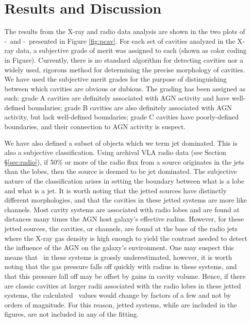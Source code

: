 \documentclass{emulateapj}
\begin{document}
\section{Results and Discussion}
\label{sec:r&d}

The results from the X-ray and radio data analysis are shown in the
two plots of \pcav-\phigh\ and \pcav-\plow\ presented in Figure
\ref{fig:pcav}. For each set of cavities analyzed in the X-ray data, a
subjective grade of merit was assigned to each (shown as color coding
in Figure). Currently, there is no standard algorithm for detecting
cavities nor a widely used, rigorous method for determining the
precise morphology of cavities. We have used the subjective merit
grades for the purpose of distinguishing between which cavities are
obvious or dubious. The grading has been assigned as such: grade A
cavities are definitely associated with AGN activity and have
well-defined boundaries; grade B cavities are also definitely
associated with AGN activity, but lack well-defined boundaries; grade
C cavities have poorly-defined boundaries, and their connection to AGN
activity is suspect.

We have also defined a subset of objects which we term jet
dominated. This is also a subjective classification. Using archival
VLA radio data (see Section \S\ref{sec:radio}), if 50\% or more of the
radio flux from a source originates in the jets than the lobes, then
the source is deemed to be jet dominated. The subjective nature of the
classification arises in setting the boundary between what is a lobe
and what is a jet. It is worth noting that the jetted sources have
distinctly different morphologies, and that the cavities in these
jetted systems are more like channels. Most cavity systems are
associated with radio lobes and are found at distances many times the
AGN host galaxy's effective radius. However, for these jetted sources,
the cavities, or channels, are found at the base of the radio jets
where the X-ray gas density is high enough to yield the contrast
needed to detect the influence of the AGN on the galaxy's
environment. One may suspect this means that \pcav\ in these systems
is grossly underestimated, however, it is worth noting that the gas
pressure falls off quickly with radius in these systems, and that this
pressure fall off may be offset by gains in cavity volume. Hence, if
there are classic cavities at larger radii associated with the radio
lobes in these jetted systems, the calculated \pcav\ values would
change by factors of a few and not by orders of magnitude. For this
reason, jetted systems, while are included in the figures, are not
included in any of the fitting.
\end{document}
